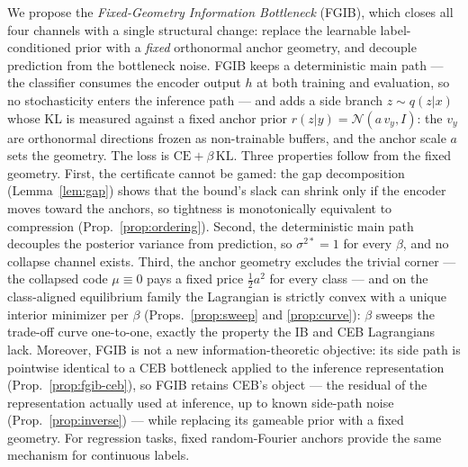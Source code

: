 We propose the \emph{Fixed-Geometry Information Bottleneck} (FGIB), which closes all four
channels with a single structural change: replace the learnable label-conditioned prior
with a \emph{fixed} orthonormal anchor geometry, and decouple prediction from the
bottleneck noise. FGIB keeps a deterministic main path --- the classifier consumes the
encoder output $h$ at both training and evaluation, so no stochasticity enters the
inference path --- and adds a side branch $z \sim q(z|x)$ whose KL is measured against a
fixed anchor prior $r(z|y) = \mathcal{N}(a\,v_y, I)$: the $v_y$ are orthonormal directions
frozen as non-trainable buffers, and the anchor scale $a$ sets the geometry. The loss is
$\mathrm{CE} + \beta\,\mathrm{KL}$. Three properties follow from the fixed geometry.
First, the certificate cannot be gamed: the gap decomposition (Lemma~\ref{lem:gap}) shows
that the bound's slack can shrink only if the encoder moves toward the anchors, so
tightness is monotonically equivalent to compression (Prop.~\ref{prop:ordering}).
Second, the deterministic main path decouples the posterior variance from prediction, so
$\sigma^{2*} = 1$ for every $\beta$, and no collapse channel exists. Third, the anchor
geometry excludes the trivial corner --- the collapsed code $\mu \equiv 0$ pays a fixed
price $\tfrac12 a^2$ for every class --- and on the class-aligned equilibrium family the
Lagrangian is strictly convex with a unique interior minimizer per $\beta$
(Props.~\ref{prop:sweep} and \ref{prop:curve}): $\beta$ sweeps the trade-off curve
one-to-one, exactly the property the IB and CEB Lagrangians lack. Moreover, FGIB is not a
new information-theoretic objective: its side path is pointwise identical to a CEB
bottleneck applied to the inference representation (Prop.~\ref{prop:fgib-ceb}), so FGIB
retains CEB's object --- the residual of the representation actually used at inference, up
to known side-path noise (Prop.~\ref{prop:inverse}) --- while replacing its gameable prior
with a fixed geometry. For regression tasks, fixed random-Fourier anchors provide the same
mechanism for continuous labels.

